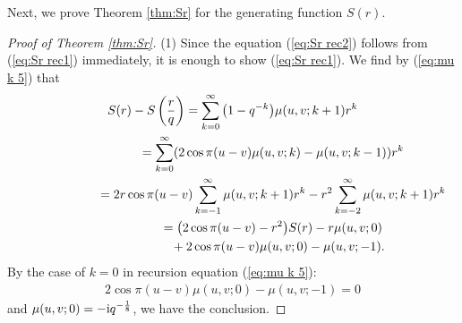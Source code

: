 \documentclass[pdftex]{sigma}
\numberwithin{equation}{section}
\theoremstyle{definition}
\begin{document}
Next, we prove Theorem \ref{thm:Sr} for the generating function $S(r)$.

\begin{proof}[Proof of Theorem \ref{thm:Sr}]
(1) Since the equation (\ref{eq:Sr rec2}) follows from (\ref{eq:Sr rec1}) immediately, it is enough to show (\ref{eq:Sr rec1}).
We find by (\ref{eq:mu k 5}) that
\begin{gather*}
S(r)-S\left(\frac{r}{q}\right)=
 \sum_{k=0}^\infty\big(1-q^{-k}\big)\mu(u,v;k+1)r^k \\
\hphantom{S(r)-S\left(\frac{r}{q}\right)}{}
=
 \sum_{k=0}^\infty(2\cos\pi(u-v)\mu(u,v;k)-\mu(u,v;k-1))r^k \nonumber\\
\hphantom{S(r)-S\left(\frac{r}{q}\right)}{}
=
 2r\cos\pi(u-v)\sum_{k=-1}^\infty\mu(u,v;k+1)r^k-r^2\sum_{k=-2}^\infty\mu(u,v;k+1)r^k \nonumber\\
\hphantom{S(r)-S\left(\frac{r}{q}\right)}{}=
 \big(2\cos\pi(u-v)-r^2\big)S(r)-r\mu(u,v;0) \\
\hphantom{S(r)-S\left(\frac{r}{q}\right)=}{}
 +2\cos\pi(u-v)\mu(u,v;0)-\mu(u,v;-1). \nonumber
\end{gather*}
By the case of $k=0$ in recursion equation (\ref{eq:mu k 5}):
\begin{gather*}
2\cos\pi(u-v)\mu(u,v;0)-\mu(u,v;-1)=0
\end{gather*}
and $\mu(u,v;0)=-{\rm i}q^{-\frac{1}{8}}$, we have the conclusion.


\end{proof}
\end{document}
